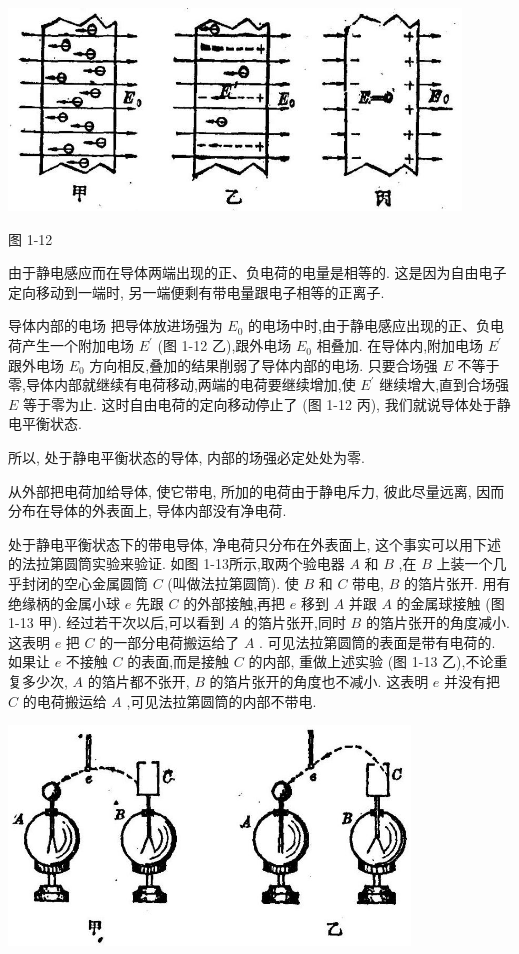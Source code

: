 \documentclass[10pt]{article}
\begin{document}
\begin{center}
\includegraphics[max width=0.9\textwidth]{images/01913056-1f15-74d8-9184-9aab52c9d66b_25_314324.jpg}
\end{center}

图 1-12

由于静电感应而在导体两端出现的正、负电荷的电量是相等的. 这是因为自由电子定向移动到一端时, 另一端便剩有带电量跟电子相等的正离子.

导体内部的电场 把导体放进场强为 \({E}_{0}\) 的电场中时,由于静电感应出现的正、负电荷产生一个附加电场 \({E}^{\prime }\) (图 1-12 乙),跟外电场 \({E}_{0}\) 相叠加. 在导体内,附加电场 \({E}^{\prime }\) 跟外电场 \({E}_{0}\) 方向相反,叠加的结果削弱了导体内部的电场. 只要合场强 \(E\) 不等于零,导体内部就继续有电荷移动,两端的电荷要继续增加,使 \({E}^{\prime }\) 继续增大,直到合场强 \(E\) 等于零为止. 这时自由电荷的定向移动停止了 (图 1-12 丙), 我们就说导体处于静电平衡状态.

所以, 处于静电平衡状态的导体, 内部的场强必定处处为零.

从外部把电荷加给导体, 使它带电, 所加的电荷由于静电斥力, 彼此尽量远离, 因而分布在导体的外表面上, 导体内部没有净电荷.

处于静电平衡状态下的带电导体, 净电荷只分布在外表面上, 这个事实可以用下述的法拉第圆筒实验来验证. 如图 1-13所示,取两个验电器 \(A\) 和 \(B\) ,在 \(B\) 上装一个几乎封闭的空心金属圆筒 \(C\) (叫做法拉第圆筒). 使 \(B\) 和 \(C\) 带电, \(B\) 的箔片张开. 用有绝缘柄的金属小球 \(e\) 先跟 \(C\) 的外部接触,再把 \(e\) 移到 \(A\) 并跟 \(A\) 的金属球接触 (图 1-13 甲). 经过若干次以后,可以看到 \(A\) 的箔片张开,同时 \(B\) 的箔片张开的角度减小. 这表明 \(e\) 把 \(C\) 的一部分电荷搬运给了 \(A\) . 可见法拉第圆筒的表面是带有电荷的. 如果让 \(e\) 不接触 \(C\) 的表面,而是接触 \(C\) 的内部, 重做上述实验 (图 1-13 乙),不论重复多少次, \(A\) 的箔片都不张开, \(B\) 的箔片张开的角度也不减小. 这表明 \(e\) 并没有把 \(C\) 的电荷搬运给 \(A\) ,可见法拉第圆筒的内部不带电.

\begin{center}
\includegraphics[max width=0.8\textwidth]{images/01913056-1f15-74d8-9184-9aab52c9d66b_26_839947.jpg}
\end{center}
\end{document}
